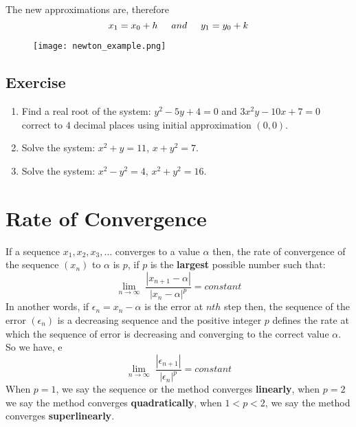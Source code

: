 \documentclass[aima203_lecturenotes_ku.tex]{subfiles}
\begin{document}
The new approximations are, therefore
\begin{equation}
  x_1 = x_0 +h \hspace{5mm} and \hspace{5mm} y_1 = y_0 + k
\end{equation}
\begin{figure}[h]
  \centering
\texttt{[image: newton\_example.png]}
\end{figure}


\subsection{Exercise}
\begin{enumerate}
\item Find a real root of the system: $y^2-5y+4=0$ and $3x^2y-10x+7 = 0$ correct to $4$ decimal places using initial approximation $(0,0)$.

\item Solve the system: $x^2+y = 11$, $x+y^2 = 7$.

\item Solve the system: $x^2-y^2 = 4$, $x^2+y^2=16$.
\end{enumerate}

\section{Rate of Convergence}
If a sequence $x_1, x_2, x_3, ...$ converges to a value $\alpha$ then, the rate of convergence of the sequence $(x_n)$ to $\alpha$ is $p$, if $p$ is the \textbf{largest} possible number such that:
\begin{equation}
  \label{rateofconverge}
 \lim_{n \to \infty} \;  \frac{|x_{n+1} - \alpha|}{|x_n-\alpha|^p} = constant
\end{equation}
In another words, if $\epsilon _n = x_n-\alpha$ is the error at $nth$ step then, the sequence of the error $(\epsilon_n)$ is a decreasing sequence and the positive integer $p$ defines the rate at which the sequence of error is decreasing and converging to the correct value $\alpha$. So we have,
 e\begin{equation*}
 \lim_{n \to \infty} \;  \frac{|\epsilon _{n+1}|}{|\epsilon _n|^p} = constant
\end{equation*}
When $p=1$, we say the sequence or the method converges \textbf{linearly}, when $p=2$ we say the method converges \textbf{quadratically}, when $1 < p < 2$, we say the method converges \textbf{superlinearly}.
\end{document}
